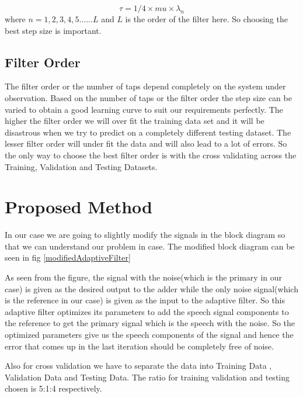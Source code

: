 \documentclass[conference]{IEEEtran}
\begin{document}
 $$ \tau = 1 / 4 \times mu \times \lambda_{n} $$
 where $n = 1,2,3,4,5......L$ and $L$ is the order of the filter here.  So choosing the best step size is important.
 
\subsection{Filter Order}
The filter order or the number of taps depend completely on the system under observation. Based on the number of taps or the filter order the step size can be varied to obtain a good learning curve to suit our requirements perfectly. The higher the filter order we will over fit the training data set and it will be disastrous when we try to predict on a completely different testing dataset. The lesser filter order will under fit the data and will also lead to a lot of errors. So the only way to choose the best filter order is with the cross validating across the Training, Validation and Testing Datasets.


\section{Proposed Method}

In our case we are going to slightly modify the signals in the block diagram so that we can understand our problem in case. The modified block diagram can be seen in fig \ref{modifiedAdaptiveFilter}

 As seen from the figure, the signal with the noise(which is the primary in our case) is given as the desired output to the adder while the only noise signal(which is the reference in our case) is given as the input to the adaptive filter.  So this adaptive filter optimizes its parameters to add the speech signal components to the reference to get the primary signal which is the speech with the noise. So the optimized parameters give us the speech components of the signal and hence the error that comes up in the last iteration should be completely free of noise. 

Also for cross validation we have to separate the data into Training Data , Validation Data and Testing Data. The ratio for training validation and testing chosen is 5:1:4 respectively. 
\end{document}
